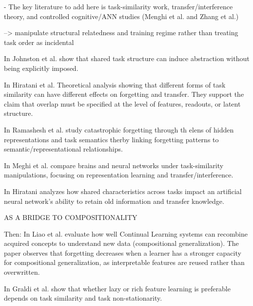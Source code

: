 \documentclass{article}
\begin{document}
            - The key literature to add here is task-similarity work, transfer/interference theory, and controlled cognitive/ANN studies (Menghi et al. and Zhang et al.) 
            
            --> manipulate structural relatedness and training regime rather than treating task order as incidental

                In \cite{johnston2023abstract} Johnston et al. show that shared task structure can induce abstraction without being explicitly imposed.
                
                In \cite{hiratani2024disentangling} Hiratani et al. Theoretical analysis showing that different forms of task similarity can have different effects on forgetting and transfer. They support the claim that overlap must be specified at the level of features, readouts, or latent structure.

                In \cite{ramasesh2020anatomy} Ramashesh et al. study catastrophic forgetting through th elens of hidden representations and task semantics therby linking forgetting patterns to semantic/representational relationships.

                In \cite{menghi2025effects} Meghi et al. compare brains and neural networks under task-similarity manipulations, focusing on representation learning and transfer/interference. %

                In \cite{hiratani2024disentangling} Hiratani analyzes how shared characteristics across tasks impact an artificial neural network's ability to retain old information and transfer knowledge.

                AS A BRIDGE TO COMPOSITIONALITY

                Then: In \cite{NEURIPS2023_6a42b45a} Liao et al. evaluate how well Continual Learning systems can recombine acquired concepts to understand new data (compositional generalization).  The paper observes that forgetting decreases when a learner has a stronger capacity for compositional generalization, as interpretable features are reused rather than overwritten.
                
                In \cite{graldi2025importance} Graldi et al. show that whether lazy or rich feature learning is preferable depends on task similarity and task non-stationarity.
                
\end{document}
